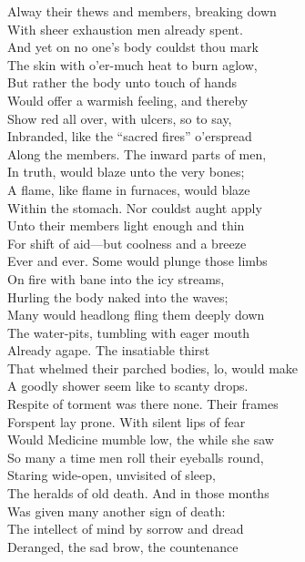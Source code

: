 Alway their thews and members, breaking down\\
With sheer exhaustion men already spent.\\
And yet on no one's body couldst thou mark\\
The skin with o'er-much heat to burn aglow,\\
But rather the body unto touch of hands\\
Would offer a warmish feeling, and thereby\\
Show red all over, with ulcers, so to say,\\
Inbranded, like the ``sacred fires'' o'erspread\\
Along the members. The inward parts of men,\\
In truth, would blaze unto the very bones;\\
A flame, like flame in furnaces, would blaze\\
Within the stomach. Nor couldst aught apply\\
Unto their members light enough and thin\\
For shift of aid—but coolness and a breeze\\
Ever and ever. Some would plunge those limbs\\
On fire with bane into the icy streams,\\
Hurling the body naked into the waves;\\
Many would headlong fling them deeply down\\
The water-pits, tumbling with eager mouth\\
Already agape. The insatiable thirst\\
That whelmed their parched bodies, lo, would make\\
A goodly shower seem like to scanty drops.\\
Respite of torment was there none. Their frames\\
Forspent lay prone. With silent lips of fear\\
Would Medicine mumble low, the while she saw\\
So many a time men roll their eyeballs round,\\
Staring wide-open, unvisited of sleep,\\
The heralds of old death. And in those months\\
Was given many another sign of death:\\
The intellect of mind by sorrow and dread\\
Deranged, the sad brow, the countenance\\
